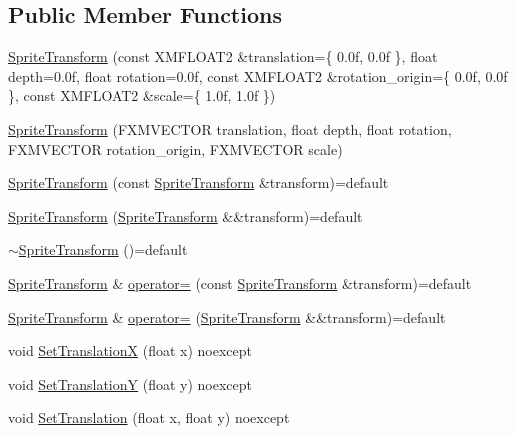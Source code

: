 \subsection*{Public Member Functions}
\begin{DoxyCompactItemize}
\item 
\hyperlink{structmage_1_1_sprite_transform_a60ab10912457ce7939c181fc67633fcf}{Sprite\+Transform} (const X\+M\+F\+L\+O\+A\+T2 \&translation=\{ 0.\+0f, 0.\+0f \}, float depth=0.\+0f, float rotation=0.\+0f, const X\+M\+F\+L\+O\+A\+T2 \&rotation\+\_\+origin=\{ 0.\+0f, 0.\+0f \}, const X\+M\+F\+L\+O\+A\+T2 \&scale=\{ 1.\+0f, 1.\+0f \})
\item 
\hyperlink{structmage_1_1_sprite_transform_a5fa3cd31b6145ce1d10a5f23dce60a82}{Sprite\+Transform} (F\+X\+M\+V\+E\+C\+T\+OR translation, float depth, float rotation, F\+X\+M\+V\+E\+C\+T\+OR rotation\+\_\+origin, F\+X\+M\+V\+E\+C\+T\+OR scale)
\item 
\hyperlink{structmage_1_1_sprite_transform_a0126a3f6c7f486f10ec5d5ffd1180698}{Sprite\+Transform} (const \hyperlink{structmage_1_1_sprite_transform}{Sprite\+Transform} \&transform)=default
\item 
\hyperlink{structmage_1_1_sprite_transform_a53d7da4498f4f9f67be2994eb4593c3a}{Sprite\+Transform} (\hyperlink{structmage_1_1_sprite_transform}{Sprite\+Transform} \&\&transform)=default
\item 
\hyperlink{structmage_1_1_sprite_transform_a14a3614023996cbb071c3de99f9528bc}{$\sim$\+Sprite\+Transform} ()=default
\item 
\hyperlink{structmage_1_1_sprite_transform}{Sprite\+Transform} \& \hyperlink{structmage_1_1_sprite_transform_af0adccff92d48e7b347e66277981ee07}{operator=} (const \hyperlink{structmage_1_1_sprite_transform}{Sprite\+Transform} \&transform)=default
\item 
\hyperlink{structmage_1_1_sprite_transform}{Sprite\+Transform} \& \hyperlink{structmage_1_1_sprite_transform_a9278d3fd0a6d346b188515b67a1adfc2}{operator=} (\hyperlink{structmage_1_1_sprite_transform}{Sprite\+Transform} \&\&transform)=default
\item 
void \hyperlink{structmage_1_1_sprite_transform_a264429e570d9f7a28478c366d1477a8f}{Set\+TranslationX} (float x) noexcept
\item 
void \hyperlink{structmage_1_1_sprite_transform_a3fd0f953867861c937380571caee65f3}{Set\+TranslationY} (float y) noexcept
\item 
void \hyperlink{structmage_1_1_sprite_transform_a2c9d8461537afabb4b53cdf3f9855e03}{Set\+Translation} (float x, float y) noexcept

\end{DoxyCompactItemize}
